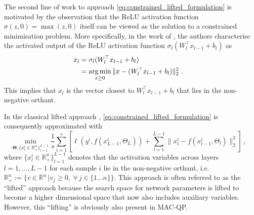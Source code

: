 The second line of work to approach \eqref{eq:constrained_lifted_formulation} is motivated by the observation that the ReLU activation function $\sigma(z, 0) = \max(z, 0)$ itself can be viewed as the solution to a constrained minimisation problem. More specifically, in the work of \cite{zhang2017convergence}, the authors characterise the activated output of the ReLU activation function $\sigma_l (W_l^\top x_{l-1} + b_{l})$ as
\begin{align*}
    x_{l} &= \sigma_l (W_l^\top x_{l-1} + b_{l}) \\
    &= \operatorname*{arg\,min}_{x \geq 0} \|x - (W_l^\top x_{l-1} + b_{l})\|_2^2 \,\, .
\end{align*}
This implies that $x_l$ is the vector closest to $W_l^\top x_{l-1} + b_{l}$ that lies in the non-negative orthant.

\noindent In the classical lifted approach \cite{askari2018lifted}, \eqref{eq:constrained_lifted_formulation} is consequently approximated with
\begin{equation}\label{eq:mlp-classical-lifted-network-training}
    \min_{\mathbf{\Theta},\{x_l^{i} \in \mathbb{R}_{+}^{n}\}_{l=1}^{L-1}} \frac{1}{s} \sum_{i=1}^{s} \left[ \ell(y^i, f(x^{i}_{L-1},\Theta_{L})) + \sum_{l=1}^{L-1} \|x^i_{l} - f(x^{i}_{l-1},\Theta_{l})\|_2^2 \right] \, ,
\end{equation}
where $\{x_l^{i} \in \mathbb{R}_{+}^{n} \}_{l=1}^{L-1}$ denotes that the activation variables across layers $l=1, \ldots, L-1$ for each sample $i$ lie in the non-negative orthant, i.e.\ $\mathbb{R}_{+}^{n} := \{v \in \mathbb{R}^n \,| v_j \geq 0, \; \forall \, j \in \{1 \ldots n\} \}$. This approach is often referred to as the ``lifted'' approach because the search space for network parameters is lifted to become a higher dimensional space that now also includes auxiliary variables. However, this ``lifting'' is obviously also present in MAC-QP.

